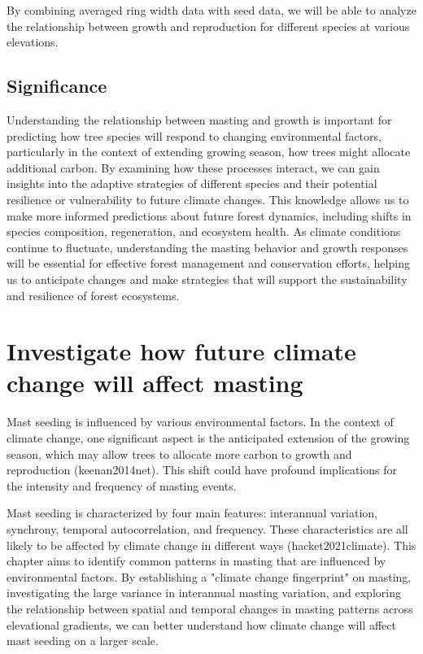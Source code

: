 \documentclass[11pt,letter]{article}
\begin{document}
By combining averaged ring width data with seed data, we will be able to analyze the relationship between growth and reproduction for different species at various elevations.

\subsection{Significance}
Understanding the relationship between masting and growth is important for predicting how tree species will respond to changing environmental factors, particularly in the context of extending growing season, how trees might allocate additional carbon. By examining how these processes interact, we can gain insights into the adaptive strategies of different species and their potential resilience or vulnerability to future climate changes. This knowledge allows us to make more informed predictions about future forest dynamics, including shifts in species composition, regeneration, and ecosystem health. As climate conditions continue to fluctuate, understanding the  masting behavior and growth responses will be essential for effective forest management and conservation efforts, helping us to anticipate changes and make strategies that will support the sustainability and resilience of forest ecosystems.

\section{Investigate how future climate change will affect masting}
Mast seeding is influenced by various environmental factors. In the context of climate change, one significant aspect is the anticipated extension of the growing season, which may allow trees to allocate more carbon to growth and reproduction (keenan2014net). This shift could have profound implications for the intensity and frequency of masting events.

Mast seeding is characterized by four main features: interannual variation, synchrony, temporal autocorrelation, and frequency. These characteristics are all likely to be affected by climate change in different ways (hacket2021climate). This chapter aims to identify common patterns in masting that are influenced by environmental factors. By establishing a "climate change fingerprint" on masting, investigating the large variance in interannual masting variation, and exploring the relationship between spatial and temporal changes in masting patterns across elevational gradients, we can better understand how climate change will affect mast seeding on a larger scale.
\end{document}
